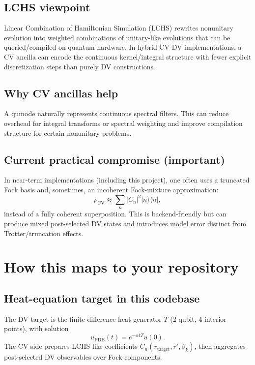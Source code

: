 \documentclass[11pt]{article}
\begin{document}
\subsection{LCHS viewpoint}
Linear Combination of Hamiltonian Simulation (LCHS) rewrites nonunitary evolution into weighted combinations of unitary-like evolutions that can be queried/compiled on quantum hardware. In hybrid CV-DV implementations, a CV ancilla can encode the continuous kernel/integral structure with fewer explicit discretization steps than purely DV constructions.

\subsection{Why CV ancillas help}
A qumode naturally represents continuous spectral filters. This can reduce overhead for integral transforms or spectral weighting and improve compilation structure for certain nonunitary problems.

\subsection{Current practical compromise (important)}
In near-term implementations (including this project), one often uses a truncated Fock basis and, sometimes, an incoherent Fock-mixture approximation:
\begin{equation}
\rho_{\text{CV}} \approx \sum_n |C_n|^2 |n\rangle\langle n|,
\end{equation}
instead of a fully coherent superposition. This is backend-friendly but can produce mixed post-selected DV states and introduces model error distinct from Trotter/truncation effects.

\section{How this maps to your repository}

\subsection{Heat-equation target in this codebase}
The DV target is the finite-difference heat generator $T$ (2-qubit, 4 interior points), with solution
\begin{equation}
u_{\text{PDE}}(t)=e^{-\alpha tT}u(0).
\end{equation}
The CV side prepares LCHS-like coefficients $C_n(r_{\text{target}},r',\beta_k)$, then aggregates post-selected DV observables over Fock components.
\end{document}
